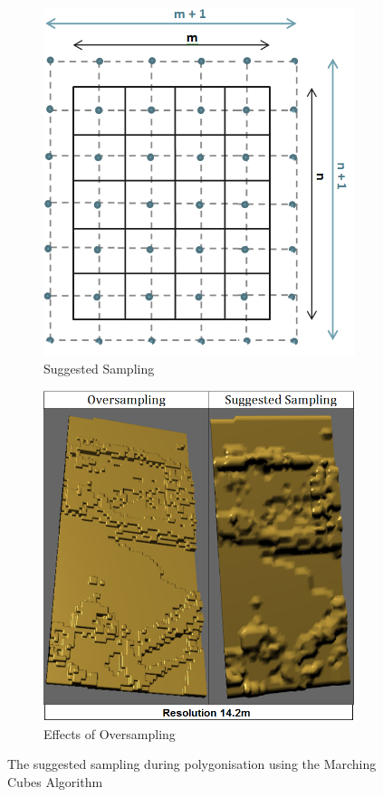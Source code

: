 \documentclass{subfiles}
\begin{document}
\begin{figure} [h!]
\begin{subfigure}[t]{.49\textwidth}
    		\centering
    		\includegraphics[width=.9\textwidth]{img/Sampling}
    		\caption{Suggested Sampling}
    		\label{fig:ExpectedSampling}
    	\end{subfigure} \hfill
    	\begin{subfigure}[t]{.49\textwidth}
    		\centering
    		\includegraphics[width=.9\textwidth]{img/OversamplingVsSuggestedSampling}
    		\caption{Effects of Oversampling} 
    		\label{fig:SamplingArtifacts}
    	\end{subfigure} \hfill
    	\caption[Marching Cubes Sampling]{The suggested sampling during polygonisation using the Marching Cubes Algorithm}
    	\label{fig:MCSampling}
    \end{figure}
\end{document}
